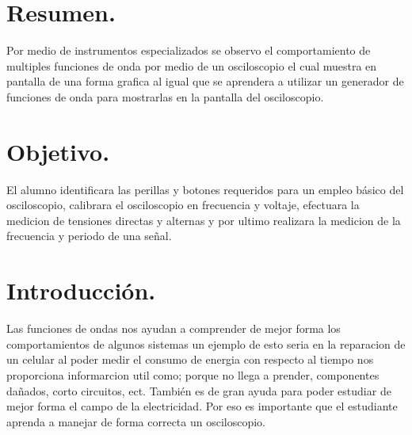 \documentclass[10pt]{article}
\begin{document}
\tableofcontents
\newpage




\section{Resumen.}
Por medio de instrumentos especializados se observo el comportamiento de multiples funciones de onda por medio de un osciloscopio el cual muestra en pantalla de una forma grafica al igual que se aprendera a utilizar un generador de funciones de onda para mostrarlas en la pantalla del osciloscopio.

\begin{multicols}{2}
\section{Objetivo.}
El alumno identificara las perillas y botones requeridos para un empleo básico del osciloscopio, calibrara el osciloscopio en frecuencia y voltaje, efectuara la medicion de tensiones directas y alternas y por ultimo realizara la medicion de la frecuencia y periodo de una señal.

\section{Introducción.}
Las funciones de ondas nos ayudan a comprender de mejor forma los comportamientos de algunos sistemas un ejemplo de esto seria en la reparacion de un celular al poder medir el consumo de energia con respecto al tiempo nos proporciona informarcion util como; porque no llega a prender, componentes dañados, corto circuitos, ect. También es de gran ayuda para poder estudiar de mejor forma el campo de la electricidad. Por eso es importante que el estudiante aprenda a manejar de forma correcta un osciloscopio.



\end{multicols}
\end{document}
